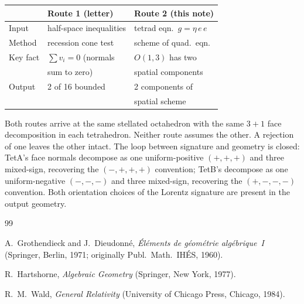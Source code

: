 \documentclass[twocolumn]{iopjournal}
\begin{document}
\vspace{6pt}
\noindent
{\footnotesize
\begin{tabular*}{\columnwidth}{@{\extracolsep{\fill}}lll@{}}
\hline
 & Route 1 (letter) & Route 2 (this note) \\
\hline
Input & half-space inequalities & tetrad eqn.\ $g = \eta\, e\, e$ \\
Method & recession cone test & scheme of quad.\ eqn. \\
Key fact & $\sum v_i = 0$ (normals & $O(1,3)$ has two \\
 & sum to zero) & spatial components \\
Output & 2 of 16 bounded & 2 components of \\
 & & spatial scheme \\
\hline
\end{tabular*}}
\vspace{6pt}

Both routes arrive at the same stellated octahedron with the same $3+1$ face decomposition in each tetrahedron. Neither route assumes the other. A rejection of one leaves the other intact. The loop between signature and geometry is closed: TetA's face normals decompose as one uniform-positive $(+,+,+)$ and three mixed-sign, recovering the $(-,+,+,+)$ convention; TetB's decompose as one uniform-negative $(-,-,-)$ and three mixed-sign, recovering the $(+,-,-,-)$ convention. Both orientation choices of the Lorentz signature are present in the output geometry.


\begin{thebibliography}{99}

A.~Grothendieck and J.~Dieudonn\'{e},
\textit{\'{E}l\'{e}ments de g\'{e}om\'{e}trie alg\'{e}brique~I}
(Springer, Berlin, 1971; originally Publ.\ Math.\ IH\'{E}S, 1960).

R.~Hartshorne,
\textit{Algebraic Geometry}
(Springer, New York, 1977).

R.~M.~Wald,
\textit{General Relativity}
(University of Chicago Press, Chicago, 1984).

\end{thebibliography}
\end{document}

